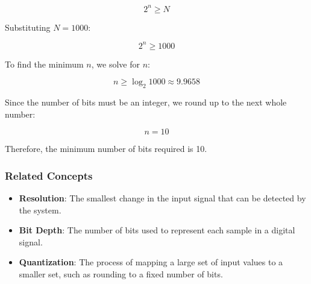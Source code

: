 \[
2^n \geq N
\]

Substituting \(N = 1000\):

\[
2^n \geq 1000
\]

To find the minimum \(n\), we solve for \(n\):

\[
n \geq \log_2{1000} \approx 9.9658
\]

Since the number of bits must be an integer, we round up to the next whole number:

\[
n = 10
\]

Therefore, the minimum number of bits required is 10.

\subsubsection{Related Concepts}
\begin{itemize}
    \item \textbf{Resolution}: The smallest change in the input signal that can be detected by the system.
    \item \textbf{Bit Depth}: The number of bits used to represent each sample in a digital signal.
    \item \textbf{Quantization}: The process of mapping a large set of input values to a smaller set, such as rounding to a fixed number of bits.
\end{itemize}

